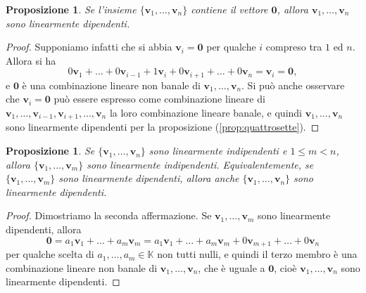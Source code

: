 \documentclass{article}
\theoremstyle{plain}
\newtheorem{prop}[thm]{Proposizione}
\theoremstyle{definition}
\theoremstyle{remark}
\begin{document}
\vspace{10pt}

\begin{bxthm}
\begin{prop}
    Se l'insieme \( \{\mathbf{v}_1, \ldots, \mathbf{v}_n\} \) contiene il vettore $\mathbf{0}$, allora \( \mathbf{v}_1, \ldots, \mathbf{v}_n \) sono linearmente dipendenti.
\end{prop}
\end{bxthm}
\begin{proof}
    Supponiamo infatti che si abbia \( \mathbf{v}_i = \mathbf{0} \) per qualche \( i \) compreso tra $1$ ed \( n \). 
    Allora si ha
    \[ 0\mathbf{v}_1 + \ldots + 0\mathbf{v}_{i-1} + 1\mathbf{v}_i + 0\mathbf{v}_{i+1} + \ldots + 0\mathbf{v}_n = \mathbf{v}_i = \mathbf{0}, \]
    e \( \mathbf{0} \) è una combinazione lineare non banale di \( \mathbf{v}_1, \ldots, \mathbf{v}_n \).
    Si può anche osservare che \( \mathbf{v}_i = \mathbf{0} \) può essere espresso come combinazione lineare di
     \( \mathbf{v}_1, \ldots, \mathbf{v}_{i-1}, \mathbf{v}_{i+1}, \ldots, \mathbf{v}_n \) la loro combinazione lineare banale, 
     e quindi \( \mathbf{v}_1, \ldots, \mathbf{v}_n \) sono linearmente dipendenti per la proposizione (\ref{prop:quattrosette}).
\end{proof}

\vspace{10pt}

\begin{bxthm}
\begin{prop}\label{prop:quattronove}
    Se \( \{\mathbf{v}_1, \ldots, \mathbf{v}_n\} \) sono linearmente indipendenti e \( 1 \leq m < n \), allora \( \{\mathbf{v}_1, \ldots, \mathbf{v}_m\} \) sono linearmente indipendenti. 
    Equivalentemente, se \( \{\mathbf{v}_1, \ldots, \mathbf{v}_m\} \) sono linearmente dipendenti, allora anche \( \{\mathbf{v}_1, \ldots, \mathbf{v}_n\} \) sono linearmente dipendenti.
\end{prop}
\end{bxthm}
\begin{proof}
    Dimostriamo la seconda affermazione. 
    Se \( \mathbf{v}_1, \ldots, \mathbf{v}_m \) sono linearmente dipendenti, allora
    \[ \mathbf{0} = a_1\mathbf{v}_1 + \ldots + a_m\mathbf{v}_m = a_1\mathbf{v}_1 + \ldots + a_m\mathbf{v}_m + 0\mathbf{v}_{m+1} + \ldots + 0\mathbf{v}_n \]
    per qualche scelta di \( a_1, \ldots, a_m \in \mathbb{K} \) non tutti nulli, e quindi il terzo membro è una combinazione lineare non banale di \( \mathbf{v}_1, \ldots, \mathbf{v}_n \), 
    che è uguale a $\mathbf{0}$, cioè \( \mathbf{v}_1, \ldots, \mathbf{v}_n \) sono linearmente dipendenti.
\end{proof}
\end{document}
